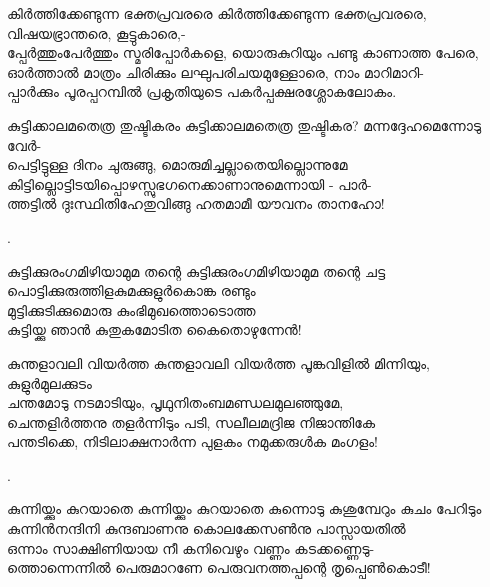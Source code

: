 \begin{enumerate}



\begin{slokam}{\VSr}{\VKG}{കിർത്തിക്കേണ്ടുന്ന ഭക്തപ്രവരരെ}
കിർത്തിക്കേണ്ടുന്ന ഭക്തപ്രവരരെ, വിഷയഭ്രാന്തരെ, കൂട്ടുകാരെ,-\\
പ്പേർത്തുംപേർത്തും സ്മരിപ്പോർകളെ, യൊരുകുറിയും പണ്ടു കാണാത്ത പേരെ, \\
ഓർത്താൽ മാത്രം ചിരിക്കും ലഘുപരിചയമുള്ളോരെ, നാം മാറിമാറി-\\
പ്പാർക്കും പൂരപ്പറമ്പിൽ പ്രകൃതിയുടെ പകർപ്പക്ഷരശ്ലോകലോകം. 
\end{slokam}


\begin{slokam}{\VSv}{\VNM}{കുട്ടിക്കാലമതെത്ര തുഷ്ടികരം}
കുട്ടിക്കാലമതെത്ര തുഷ്ടികര? മന്നദ്ദേഹമെന്നോടു വേർ-\\
പെട്ടിട്ടുള്ള ദിനം ചുരുങ്ങു, മൊരുമിച്ചല്ലാതെയില്ലൊന്നുമേ\\
കിട്ടില്ലൊട്ടിടയിപ്പൊഴസ്സുഭഗനെക്കാണാനുമെന്നായി - പാർ-\\
ത്തട്ടിൽ ദുഃസ്ഥിതിഹേതുവിങ്ങു ഹതമാമീ യൗവനം താനഹോ!
\end{slokam}


.

\begin{slokam}{\VVt}{\VenM}{കുട്ടിക്കുരംഗമിഴിയാമുമ തന്റെ}
കുട്ടിക്കുരംഗമിഴിയാമുമ തന്റെ ചട്ട \\
പൊട്ടിക്കുരുത്തിളകുമക്കുളുർകൊങ്ക രണ്ടും \\
മുട്ടിക്കുടിക്കുമൊരു കുംഭിമുഖത്തൊടൊത്ത \\
കുട്ടിയ്ക്കു ഞാൻ കുതുകമോടിത കൈതൊഴുന്നേൻ!
\end{slokam}


\begin{slokam}{\VKm}{\VNM}{കുന്തളാവലി വിയർത്ത}
കുന്തളാവലി വിയർത്ത പൂങ്കവിളിൽ മിന്നിയും, കുളുർമുലക്കുടം\\
ചന്തമോടു നടമാടിയും, പൃഥുനിതംബമണ്ഡലമുലഞ്ഞുമേ,\\
ചെന്തളിർത്തനു തളർന്നിടും പടി, സലീലമദ്രിജ നിജാന്തികേ\\
പന്തടിക്കെ, നിടിലാക്ഷനാർന്ന പുളകം നമുക്കരുള്‍ക മംഗളം!
\end{slokam}



.


\begin{slokam}{\VSv}{\SVL}{കുന്നിയ്ക്കും കുറയാതെ}
കുന്നിയ്ക്കും കുറയാതെ കുന്നൊടു കുശുമ്പേറും കുചം പേറിടും\\
കുന്നിൻനന്ദിനി കുന്ദബാണനു കൊലക്കേസൺനു പാസ്സായതിൽ\\
ഒന്നാം സാക്ഷിണിയായ നീ കനിവെഴും വണ്ണം കടക്കണ്ണെടു-\\
ത്തൊന്നെന്നിൽ പെരുമാറണേ പെരുവനത്തപ്പന്റെ തൃപ്പെൺകൊടീ!
\end{slokam}


\end{enumerate}
